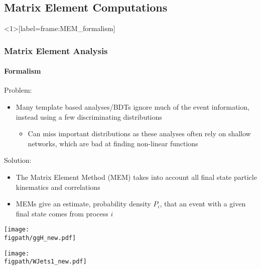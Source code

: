 

\subsection*{Matrix Element Computations}


\begin{frame}<1>[label=frame:MEM_formalism]
	\frametitle{Matrix Element Analysis}
	\framesubtitle{Formalism}
	\vspace*{-0.24cm}
	\footnotesize
	\begin{block}{Problem:}
	\begin{itemize}
		\item Many template based analyses/BDTs ignore much of the event information, instead using a few discriminating distributions
		\begin{itemize}
			\footnotesize
			\item Can miss important distributions as these analyses often rely on shallow networks, which are bad at finding non-linear functions
		\end{itemize}
	\end{itemize}
	\end{block}
	\vspace*{-0.24cm}
	\begin{block}{Solution:}
		\begin{itemize}
			\scriptsize
			\item The Matrix Element Method (MEM) takes into account all final state particle kinematics and correlations
			\item MEMs give an estimate, probability density $P_{i}$, that an event with a given final state comes from process $i$
		\end{itemize}
		\vspace*{-0.15cm}
		 {
			\begin{center}
				\texttt{[image: \\figpath/ggH\_new.pdf]}
			\end{center}
		}
		\only<2> {
			\begin{center}
				\texttt{[image: \\figpath/WJets1\_new.pdf]}
			\end{center}
		}
		\only<3-> {
		\begin{equation}\label{eq:MEM_probability}

\end{equation}}
\end{block}
\end{frame}
